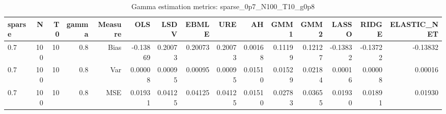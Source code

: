 \begin{table}[!htbp]\centering
\caption{Gamma estimation metrics: sparse_0p7_N100_T10_g0p8}
\label{tab:table1_sparse_0p7_N100_T10_g0p8}
\begin{tabular}{lrrrrrrrrrrrrrr}
\hline
sparse & N & T0 & gamma & Measure & OLS & LSDV & EBMLE & URE & AH & GMM1 & GMM2 & LASSO & RIDGE & ELASTIC_NET \\
\hline
0.7 & 100 & 10 & 0.8 & Bias & -0.13869 & 0.20073 & 0.20073 & 0.20073 & 0.00168 & 0.11199 & 0.12127 & -0.13832 & -0.13722 & -0.13832 \\
0.7 & 100 & 10 & 0.8 & Var & 0.00008 & 0.00095 & 0.00095 & 0.00095 & 0.01510 & 0.01529 & 0.02184 & 0.00016 & 0.00008 & 0.00016 \\
0.7 & 100 & 10 & 0.8 & MSE & 0.01931 & 0.04125 & 0.04125 & 0.04125 & 0.01510 & 0.02783 & 0.03655 & 0.01930 & 0.01891 & 0.01930 \\
\hline
\end{tabular}
\end{table}


